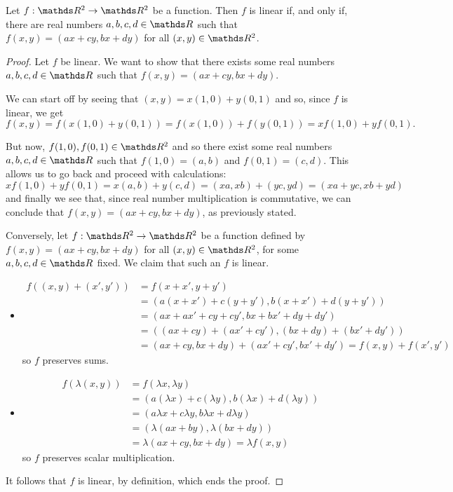 \begin{lemma}
	Let $f:\R^2\to\R^2$ be a function. Then $f$ is linear if, and only if, there are real numbers $a,b,c,d\in \R$ such that $f(x,y)=(ax+cy,bx+dy)$ for all $(x,y)\in \R^2$.
\end{lemma}
\begin{proof}
	Let $f$ be linear. We want to show that there exists some real numbers $a,b,c,d\in\R$ such that $f(x,y)=(ax+cy,bx+dy)$.
	
	We can start off by seeing that $(x,y)=x(1,0)+y(0,1)$ and so, since $f$ is linear, we get $$f(x,y)=f(x(1,0)+y(0,1))=f(x(1,0))+f(y(0,1))=xf(1,0)+yf(0,1).$$
	
	But now, $f(1,0),f(0,1)\in\R^2$ and so there exist some real numbers $a,b,c,d\in \R$ such that $f(1,0)=(a,b)$ and $f(0,1)=(c,d)$. This allows us to go back and proceed with calculations:
	\[xf(1,0)+yf(0,1)=x(a,b)+y(c,d)=(xa,xb)+(yc,yd)=(xa+yc,xb+yd)\]and finally we see that, since real number multiplication is commutative, we can conclude that $f(x,y)=(ax+cy,bx+dy)$, as previously stated.
	
	\bigskip
	Conversely, let $f:\R^2\to\R^2$ be a function defined by $f(x,y)=(ax+cy,bx+dy)$ for all $(x,y)\in \R^2$, for some $a,b,c,d\in\R$ fixed. We claim that such an $f$ is linear.
	
	\begin{itemize}
		\item \begin{align*}
			f((x,y)+(x',y'))&=f(x+x',y+y')\\
			&=(a(x+x')+c(y+y'),b(x+x')+d(y+y'))\\
			&=(ax+ax'+cy+cy',bx+bx'+dy+dy')\\
			&=((ax+cy)+(ax'+cy'),(bx+dy)+(bx'+dy'))\\
			&=(ax+cy,bx+dy)+(ax'+cy',bx'+dy')=f(x,y)+f(x',y')
		\end{align*}so $f$ preserves sums.
		
		\item \begin{align*}
			f(\lambda (x,y))&=f(\lambda x,\lambda y)\\
			&=(a(\lambda x)+c(\lambda y),b(\lambda x)+d(\lambda y))\\
			&=(a\lambda x+c\lambda y,b\lambda x+d\lambda y)\\
			&=(\lambda (ax+by),\lambda(bx+dy))\\
			&=\lambda(ax+cy,bx+dy)=\lambda f(x,y)
		\end{align*}so $f$ preserves scalar multiplication.
	\end{itemize}

It follows that $f$ is linear, by definition, which ends the proof.
\end{proof}


